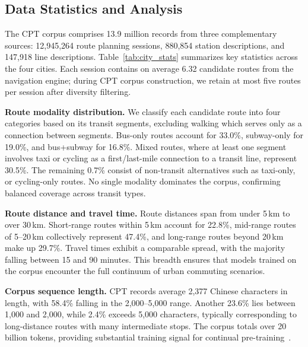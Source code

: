 \documentclass{llmxive}
\begin{document}
\subsection{Data Statistics and Analysis}
\label{sec:stats}

The CPT corpus comprises 13.9 million records from three complementary sources: 12,945,264 route planning sessions, 880,854 station descriptions, and 147,918 line descriptions. Table~\ref{tab:city_stats} summarizes key statistics across the four cities. Each session contains on average 6.32 candidate routes from the navigation engine; during CPT corpus construction, we retain at most five routes per session after diversity filtering.

\textbf{Route modality distribution.}
We classify each candidate route into four categories based on its transit segments, excluding walking which serves only as a connection between segments. Bus-only routes account for 33.0\%, subway-only for 19.0\%, and bus+subway for 16.8\%. Mixed routes, where at least one segment involves taxi or cycling as a first/last-mile connection to a transit line, represent 30.5\%. The remaining 0.7\% consist of non-transit alternatives such as taxi-only, or cycling-only routes. No single modality dominates the corpus, confirming balanced coverage across transit types.

\textbf{Route distance and travel time.}
Route distances span from under 5\,km to over 30\,km. Short-range routes within 5\,km account for 22.8\%, mid-range routes of 5--20\,km collectively represent 47.4\%, and long-range routes beyond 20\,km make up 29.7\%. Travel times exhibit a comparable spread, with the majority falling between 15 and 90 minutes. This breadth ensures that models trained on the corpus encounter the full continuum of urban commuting scenarios.

\textbf{Corpus sequence length.}
CPT records average 2,377 Chinese characters in length, with 58.4\% falling in the 2,000--5,000 range. Another 23.6\% lies between 1,000 and 2,000, while 2.4\% exceeds 5,000 characters, typically corresponding to long-distance routes with many intermediate stops. The corpus totals over 20 billion tokens, providing substantial training signal for continual pre-training~\cite{hoffmann2022training}.
\end{document}
